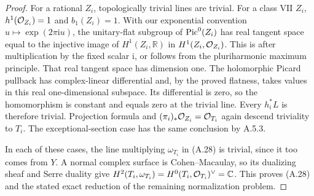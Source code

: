\begin{proof}
For a rational $Z_i$, topologically trivial lines are trivial. For a class VII $Z_i$, $h^1(\mathcal O_{Z_i})=1$ and $b_1(Z_i)=1$. With our exponential convention $u\mapsto\exp(2\pi\mathrm i u)$, the unitary-flat subgroup of $\operatorname{Pic}^0(Z_i)$ has real tangent space equal to the injective image of $H^1(Z_i,\mathbb R)$ in $H^1(Z_i,\mathcal O_{Z_i})$. This is \cite[Lemma~2.3(2)]{Teleman2006} after multiplication by the fixed scalar $\mathrm i$, or follows from the pluriharmonic maximum principle. That real tangent space has dimension one. The holomorphic Picard pullback has complex-linear differential and, by the proved flatness, takes values in this real one-dimensional subspace. Its differential is zero, so the homomorphism is constant and equals zero at the trivial line. Every $h_i^*L$ is therefore trivial. Projection formula and $(\pi_i)_*\mathcal O_{Z_i}=\mathcal O_{T_i}$ again descend triviality to $T_i$. The exceptional-section case has the same conclusion by A.5.3.

In each of these cases, the line multiplying $\omega_{T_i}$ in (A.28) is trivial, since it too comes from $Y$. A normal complex surface is Cohen--Macaulay, so its dualizing sheaf and Serre duality give $H^2(T_i,\omega_{T_i})=H^0(T_i,\mathcal O_{T_i})^\vee=\mathbb C$. This proves (A.28) and the stated exact reduction of the remaining normalization problem.
\end{proof}



